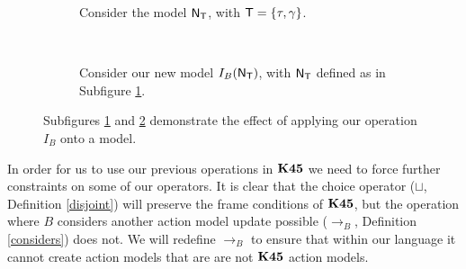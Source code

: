 \begin{figure}
\centering
\begin{subfigure}[b]{.45\textwidth}
\centering
{}
\caption{Consider the model $\mathrm{\mathsf{N}}_\mathrm{\mathsf{T}}$, with $\mathrm{\mathsf{T}} = \{\tau, \gamma\}$.}
\label{beforeOperation}
\end{subfigure}
~
\begin{subfigure}[b]{.45\textwidth}
\centering
{}
\caption{Consider our new model $I_B(\mathrm{\mathsf{N}}_\mathrm{\mathsf{T}})$, with $\mathrm{\mathsf{N}}_\mathrm{\mathsf{T}}$ defined as in Subfigure
\ref{beforeOperation}.}
\label{afterOperation}
\end{subfigure}
\caption[Applying $I_B$]{Subfigures \ref{beforeOperation} and \ref{afterOperation} demonstrate the effect of
applying our operation $I_B$ onto a model.}
\label{beforeAfterI}
\end{figure}

In order for us to use our previous operations in $\bf K45$ we need to force further constraints on
some of our operators.
It is clear that the choice operator ($\sqcup$, Definition \ref{disjoint}) will preserve the frame
conditions of $\bf K45$, but the operation where $B$ considers another action model update possible
($\to_B$, Definition \ref{considers}) does not.
We will redefine $\to_B$ to ensure that within our language it cannot create action models that are
are not $\bf K45$ action models.

